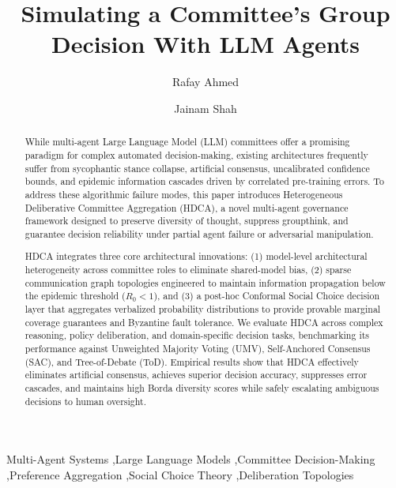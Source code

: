 \documentclass[a4paper,fleqn]{cas-sc}
\begin{document}
\let\WriteBookmarks\relax


\title [mode = title]{Simulating a Committee's Group Decision With LLM Agents}

\author{Rafay Ahmed}
\author{Jainam Shah}
\address{K.J Somaiya School of Engineering}

\begin{abstract}
While multi-agent Large Language Model (LLM) committees offer a promising paradigm for complex automated decision-making, existing architectures frequently suffer from sycophantic stance collapse, artificial consensus, uncalibrated confidence bounds, and epidemic information cascades driven by correlated pre-training errors. To address these algorithmic failure modes, this paper introduces Heterogeneous Deliberative Committee Aggregation (HDCA), a novel multi-agent governance framework designed to preserve diversity of thought, suppress groupthink, and guarantee decision reliability under partial agent failure or adversarial manipulation.

HDCA integrates three core architectural innovations: (1) model-level architectural heterogeneity across committee roles to eliminate shared-model bias, (2) sparse communication graph topologies engineered to maintain information propagation below the epidemic threshold ($R_0 < 1$), and (3) a post-hoc Conformal Social Choice decision layer that aggregates verbalized probability distributions to provide provable marginal coverage guarantees and Byzantine fault tolerance. We evaluate HDCA across complex reasoning, policy deliberation, and domain-specific decision tasks, benchmarking its performance against Unweighted Majority Voting (UMV), Self-Anchored Consensus (SAC), and Tree-of-Debate (ToD). Empirical results show that HDCA effectively eliminates artificial consensus, achieves superior decision accuracy, suppresses error cascades, and maintains high Borda diversity scores while safely escalating ambiguous decisions to human oversight.
\end{abstract}

\begin{keywords}
Multi-Agent Systems \sep Large Language Models \sep Committee Decision-Making \sep Preference Aggregation \sep Social Choice Theory \sep Deliberation Topologies
\end{keywords}

\maketitle
\end{document}
